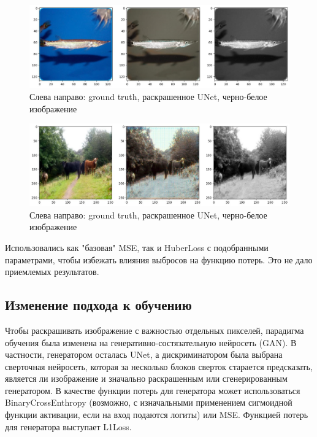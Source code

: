 \documentclass[14pt]{article}
\begin{document}
\begin{figure}[H]
    \centering
    \includegraphics[width=1.0\textwidth]{resources/bad_fish_colorization.png}
    \caption{Слева направо: ground truth, раскрашенное UNet, черно-белое изображение}
    \label{fig:id_figura}
\end{figure}


\begin{figure}[H]
    \centering
    \includegraphics[width=1.0\textwidth]{resources/bad_cows_colorization.png}
    \caption{Слева направо: ground truth, раскрашенное UNet, черно-белое изображение}
    \label{fig:id_figura}
\end{figure}

Использовались как "базовая" MSE, так и HuberLoss с подобранными параметрами, чтобы избежать влияния выбросов на функцию потерь. Это не дало
приемлемых результатов.

\subsection{Изменение подхода к обучению}

Чтобы раскрашивать изображение с важностью отдельных пикселей, парадигма обучения была изменена на генеративно-состязательную нейросеть (GAN).
В частности, генератором осталась UNet, а дискриминатором была выбрана сверточная нейросеть, которая за несколько блоков сверток
старается предсказать, является ли изображение и значально раскрашенным или сгенерированным генератором. В качестве функции потерь для генератора может использоваться
BinaryCrossEnthropy (возможно, с изначальными применением сигмоидной функции активации, если на вход подаются логиты) или MSE. Функцией
потерь для генератора выступает L1Loss.
\end{document}

